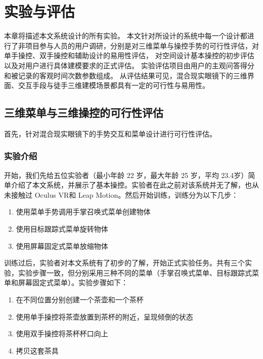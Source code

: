
\chapter{实验与评估}
\label{chap:exp}

本章将描述本文系统设计的所有实验。
本文针对所设计的系统中每一个设计都进行了非项目参与人员的用户调研，分别是对三维菜单与操控手势的可行性评估，对单手操控、双手操控和辅助设计的易用性评估，
对空间设计基本操控的初步评估以及对用户进行具体建模要求的正式评估。
实验评估项目由用户的主观问答得分和被记录的客观时间次数参数组成。
从评估结果可见，混合现实眼镜下的三维界面、交互手段与徒手三维建模场景都具有一定的可行性与易用性。

\section{三维菜单与三维操控的可行性评估}
\label{sec:exp:feasibility}
首先，针对混合现实眼镜下的手势交互和菜单设计进行可行性评估。
\subsection{实验介绍}
开始，我们先给五位实验者（最小年龄 22 岁，最大年龄 25 岁，平均 23.4岁）简单介绍了本文系统，并展示了基本操控。实验者在此之前对该系统并无了解，也从未接触过 Oculus VR和 Leap Motion。然后开始训练，训练分为以下几步：
\begin{enumerate}
\item 使用菜单手势调用手掌召唤式菜单创建物体
\item 使用目标跟踪式菜单旋转物体
\item 使用屏幕固定式菜单放缩物体
\end{enumerate}

训练过后，实验者对本文系统有了初步的了解，开始正式实验任务。共有三个实验，实验步骤一致，但分别采用三种不同的菜单（手掌召唤式菜单、目标跟踪式菜单和屏幕固定式菜单）。实验步骤如下：

\begin{enumerate}
\item 在不同位置分别创建一个茶壶和一个茶杯
\item 使用单手操控将茶壶放置到茶杯的附近，呈现倾倒的状态
\item 使用双手操控将茶杯杯口向上
\item 拷贝这套茶具
\end{enumerate}

